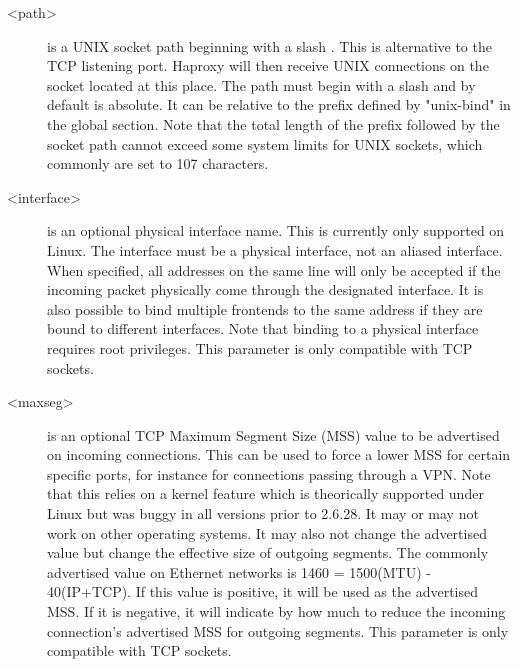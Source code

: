 \begin{description}
  \item[<path>]
                  is a UNIX socket path beginning with a slash \chr{/}. This is
                  alternative to the TCP listening port. Haproxy will then
                  receive UNIX connections on the socket located at this place.
                  The path must begin with a slash and by default is absolute.
                  It can be relative to the prefix defined by "unix-bind" in
                  the global section. Note that the total length of the prefix
                  followed by the socket path cannot exceed some system limits
                  for UNIX sockets, which commonly are set to 107 characters.

  \item[<interface>]
                  is an optional physical interface name. This is currently
                  only supported on Linux. The interface must be a physical
                  interface, not an aliased interface. When specified, all
                  addresses on the same line will only be accepted if the
                  incoming packet physically come through the designated
                  interface. It is also possible to bind multiple frontends to
                  the same address if they are bound to different interfaces.
                  Note that binding to a physical interface requires root
                  privileges. This parameter is only compatible with TCP
                  sockets.

  \item[<maxseg>]
                  is an optional TCP Maximum Segment Size (MSS) value to be
                  advertised on incoming connections. This can be used to force
                  a lower MSS for certain specific ports, for instance for
                  connections passing through a VPN. Note that this relies on a
                  kernel feature which is theorically supported under Linux but
                  was buggy in all versions prior to 2.6.28. It may or may not
                  work on other operating systems. It may also not change the
                  advertised value but change the effective size of outgoing
                  segments. The commonly advertised value on Ethernet networks
                  is 1460 = 1500(MTU) - 40(IP+TCP). If this value is positive,
                  it will be used as the advertised MSS. If it is negative, it
                  will indicate by how much to reduce the incoming connection's
                  advertised MSS for outgoing segments. This parameter is only
                  compatible with TCP sockets.


\end{description}
